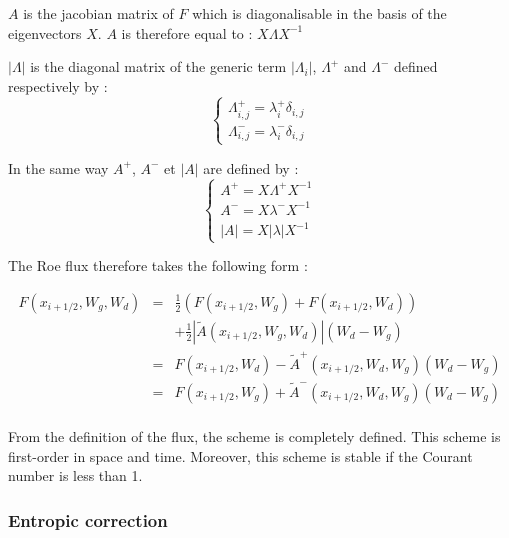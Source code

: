 $A$ is the jacobian matrix of $F$ which is diagonalisable in the basis of the eigenvectors $X$. $A$ is therefore equal to : $X \Lambda X^{-1}$

$|\Lambda|$ is the diagonal matrix of the generic term $|\Lambda_i|$, $\Lambda^{+}$ and $\Lambda^{-}$ defined respectively by :
\begin{equation}
  \left \lbrace
  \begin{array}{l}
   \Lambda_{i,j}^{+}  = \lambda_{i}^{+} \delta_{i,j}\\
   \Lambda_{i,j}^{-}  = \lambda_{i}^{-} \delta_{i,j}
\end{array}
 \right.
\end{equation}

In the same way $A^+$, $A^-$ et $|A|$ are defined by :
\begin{equation}
  \left \lbrace
  \begin{array}{l}
   A^{+}  = X \Lambda^{+} X^{-1} \\
   A^{-}  = X \lambda^{-} X^{-1} \\
   |A| = X |\lambda| X^{-1}
\end{array}
 \right.
\end{equation}

The Roe flux therefore takes the following form :

\begin{eqnarray}
 F(x_{i+1/2},W_g,W_d) & = & \frac{1}{2} \left ( F(x_{i+1/2},W_g) + F(x_{i+1/2},W_d) \right ) \nonumber \\
                      &   & + \frac{1}{2} \left | \tilde{A}(x_{i+1/2},W_g,W_d) \right | (W_d -W_g) \nonumber \\
 & = & F(x_{i+1/2},W_d) - \tilde{A}^+ (x_{i+1/2},W_d,W_g) (W_d - W_g) \nonumber \\
 & = & F(x_{i+1/2},W_g) + \tilde{A}^- (x_{i+1/2},W_d,W_g) (W_d - W_g) \nonumber \\
 & &
\end{eqnarray}

From the definition of the flux, the scheme is completely defined. This scheme is first-order in space and time.  Moreover, this scheme is stable if the Courant number is less than 1.

\subsubsection{Entropic correction}

